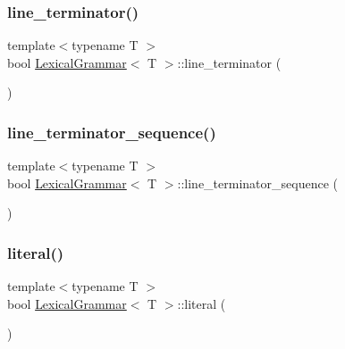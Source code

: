 \mbox{\label{class_lexical_grammar_ab0cbd5b59a7478d0f1042774b877714d}} 
\subsubsection{\texorpdfstring{line\+\_\+terminator()}{line\_terminator()}}
{\footnotesize\ttfamily template$<$typename T $>$ \\
bool \hyperlink{class_lexical_grammar}{Lexical\+Grammar}$<$ T $>$\+::line\+\_\+terminator (\begin{DoxyParamCaption}{ }\end{DoxyParamCaption})\hspace{0.3cm}{\ttfamily [inline]}}

\mbox{\label{class_lexical_grammar_a43737fd87e454c3a426c047b02f376f6}} 
\subsubsection{\texorpdfstring{line\+\_\+terminator\+\_\+sequence()}{line\_terminator\_sequence()}}
{\footnotesize\ttfamily template$<$typename T $>$ \\
bool \hyperlink{class_lexical_grammar}{Lexical\+Grammar}$<$ T $>$\+::line\+\_\+terminator\+\_\+sequence (\begin{DoxyParamCaption}{ }\end{DoxyParamCaption})\hspace{0.3cm}{\ttfamily [inline]}}

\mbox{\label{class_lexical_grammar_aae192a9c337028f4edbfe210e587d2dc}} 
\subsubsection{\texorpdfstring{literal()}{literal()}}
{\footnotesize\ttfamily template$<$typename T $>$ \\
bool \hyperlink{class_lexical_grammar}{Lexical\+Grammar}$<$ T $>$\+::literal (\begin{DoxyParamCaption}{ }\end{DoxyParamCaption})\hspace{0.3cm}{\ttfamily [inline]}}

